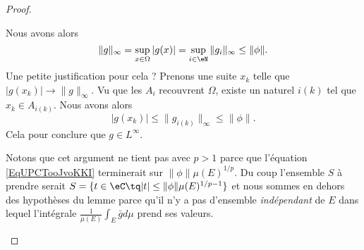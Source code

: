 \begin{proof}
\begin{subproof}
    Nous avons alors
    \begin{equation}
        \| g \|_{\infty}=\sup_{x\in \Omega}| g(x) |=\sup_{i\in \eN}\| g_i \|_{\infty}\leq \| \phi \|.
    \end{equation}
    Une petite justification pour cela ? Prenons une suite \( x_k\) telle que \( | g(x_k) |\to \| g \|_{\infty}\). Vu que les \( A_i\) recouvrent \( \Omega\), existe un naturel \( i(k)\) tel que \( x_k\in A_{i(k)}\). Nous avons alors
    \begin{equation}
        | g(x_k) |\leq \| g_{i(k)} \|_{\infty}\leq \| \phi \|.
    \end{equation}
    Cela pour conclure que \( g\in L^{\infty}\).

    Notons que cet argument ne tient pas avec \( p> 1\) parce que l'équation \eqref{EqUPCTooJvoKKI} terminerait sur \( \| \phi \|\mu(E)^{1/p}\). Du coup l'ensemble \( S\) à prendre serait \( S=\{ t\in \eC\tq | t |\leq \| \phi \|\mu(E)^{1/p-1} \}\) et nous sommes en dehors des hypothèses du lemme parce qu'il n'y a pas d'ensemble \emph{indépendant} de \( E\) dans lequel l'intégrale \( \frac{1}{ \mu(E) }\int_{E}\bar gd\mu\) prend ses valeurs.

    \spitem[\( 1<p<\infty\)]


\end{subproof}
\end{proof}
